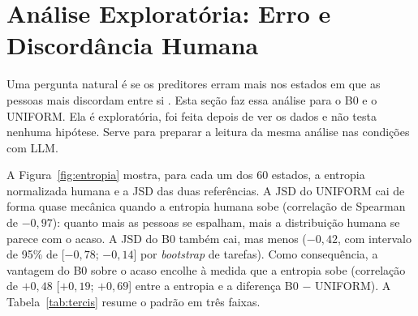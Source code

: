 \documentclass[12pt,oneside,a4paper,chapter=TITLE,english,brazil]{abntex2}
\begin{document}
\section{Análise Exploratória: Erro e Discordância Humana}
\label{sec:entropia}

Uma pergunta natural é se os preditores erram mais nos estados em que as pessoas mais discordam entre si \cite{lee2023dissenting}. Esta seção faz essa análise para o B0 e o UNIFORM. Ela é exploratória, foi feita depois de ver os dados e não testa nenhuma hipótese. Serve para preparar a leitura da mesma análise nas condições com LLM.

\begin{real}
A Figura~\ref{fig:entropia} mostra, para cada um dos 60 estados, a entropia normalizada humana e a JSD das duas referências. A JSD do UNIFORM cai de forma quase mecânica quando a entropia humana sobe (correlação de Spearman de $-0{,}97$): quanto mais as pessoas se espalham, mais a distribuição humana se parece com o acaso. A JSD do B0 também cai, mas menos ($-0{,}42$, com intervalo de 95\% de [$-0{,}78$; $-0{,}14$] por \textit{bootstrap} de tarefas). Como consequência, a vantagem do B0 sobre o acaso encolhe à medida que a entropia sobe (correlação de $+0{,}48$ [$+0{,}19$; $+0{,}69$] entre a entropia e a diferença B0 $-$ UNIFORM). A Tabela~\ref{tab:tercis} resume o padrão em três faixas.
\end{real}
\end{document}

